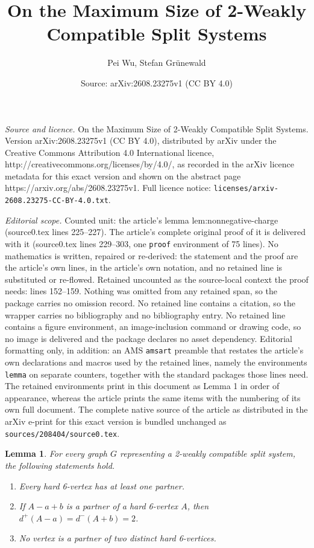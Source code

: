 \documentclass[10pt,a4paper]{amsart}
\title{On the Maximum Size of 2-Weakly Compatible Split Systems}
\author{Pei Wu, Stefan Gr\"unewald}
\date{Source: arXiv:2608.23275v1 (CC BY 4.0)}
\newtheorem{lemma}{Lemma}
\begin{document}
\maketitle

\noindent\emph{Source and licence.} On the Maximum Size of 2-Weakly Compatible Split Systems. Version arXiv:2608.23275v1 (CC BY 4.0), distributed by arXiv under the Creative Commons Attribution 4.0 International licence, http://creativecommons.org/licenses/by/4.0/, as recorded in the arXiv licence metadata for this exact version and shown on the abstract page https://arxiv.org/abs/2608.23275v1. Full licence notice: \texttt{licenses/arxiv-2608.23275-CC-BY-4.0.txt}.\par\smallskip

\noindent\textit{Editorial scope.} Counted unit: the article's lemma lem:nonnegative-charge (source0.tex lines 225--227). The article's complete original proof of it is delivered with it (source0.tex lines 229--303, one \texttt{proof} environment of 75 lines). No mathematics is written, repaired or re-derived: the statement and the proof are the article's own lines, in the article's own notation, and no retained line is substituted or re-flowed.  Retained uncounted as the source-local context the proof needs: lines 152--159.  Nothing was omitted from any retained span, so the package carries no omission record.  No retained line contains a citation, so the wrapper carries no bibliography and no bibliography entry.  No retained line contains a figure environment, an image-inclusion command or drawing code, so no image is delivered and the package declares no asset dependency.  Editorial formatting only, in addition: an AMS \texttt{amsart} preamble that restates the article's own declarations and macros used by the retained lines, namely the environments \texttt{lemma} on separate counters, together with the standard packages those lines need.  The retained environments print in this document as Lemma 1 in order of appearance, whereas the article prints the same items with the numbering of its own full document.  The complete native source of the article as distributed in the arXiv e-print for this exact version is bundled unchanged as \texttt{sources/208404/source0.tex}.
	\begin{lemma}\label{lem:hard-partners}
		For every graph $G$ representing a 2-weakly compatible split system, the following statements hold.
		\begin{enumerate}[label=(\roman*)]
			\item Every hard 6-vertex has at least one partner.
			\item If $A-a+b$ is a partner of a hard 6-vertex $A$, then $d^+(A-a)=d^-(A+b)=2$.
			\item No vertex is a partner of two distinct hard 6-vertices.
		\end{enumerate}
	\end{lemma}
\end{document}
